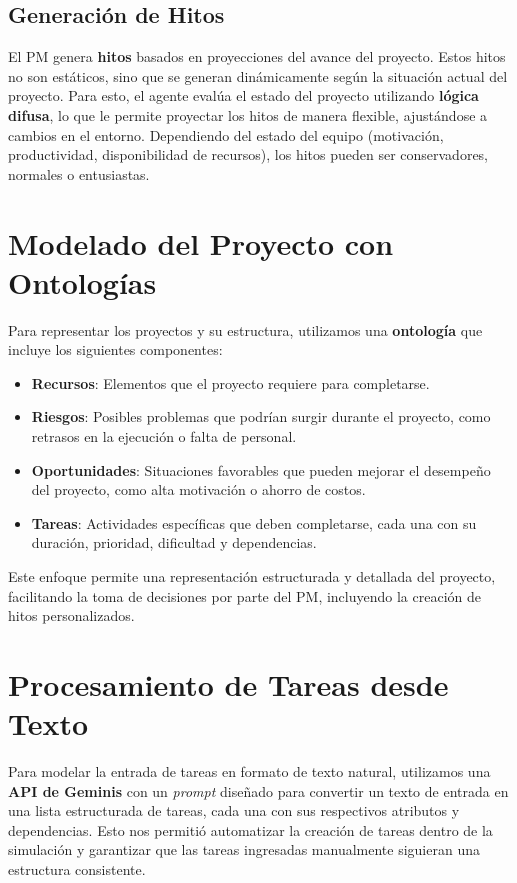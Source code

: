 \documentclass[a4paper, 12pt]{article}
\begin{document}
\subsection{Generación de Hitos}
El PM genera \textbf{hitos} basados en proyecciones del avance del proyecto. Estos hitos no son estáticos, sino que se generan dinámicamente según la situación actual del proyecto. Para esto, el agente evalúa el estado del proyecto utilizando \textbf{lógica difusa}, lo que le permite proyectar los hitos de manera flexible, ajustándose a cambios en el entorno. Dependiendo del estado del equipo (motivación, productividad, disponibilidad de recursos), los hitos pueden ser conservadores, normales o entusiastas.

\section{Modelado del Proyecto con Ontologías}
Para representar los proyectos y su estructura, utilizamos una \textbf{ontología} que incluye los siguientes componentes:
\begin{itemize}
    \item \textbf{Recursos}: Elementos que el proyecto requiere para completarse.
    \item \textbf{Riesgos}: Posibles problemas que podrían surgir durante el proyecto, como retrasos en la ejecución o falta de personal.
    \item \textbf{Oportunidades}: Situaciones favorables que pueden mejorar el desempeño del proyecto, como alta motivación o ahorro de costos.
    \item \textbf{Tareas}: Actividades específicas que deben completarse, cada una con su duración, prioridad, dificultad y dependencias.
\end{itemize}
Este enfoque permite una representación estructurada y detallada del proyecto, facilitando la toma de decisiones por parte del PM, incluyendo la creación de hitos personalizados.

\section{Procesamiento de Tareas desde Texto}
Para modelar la entrada de tareas en formato de texto natural, utilizamos una \textbf{API de Geminis} con un \textit{prompt} diseñado para convertir un texto de entrada en una lista estructurada de tareas, cada una con sus respectivos atributos y dependencias. Esto nos permitió automatizar la creación de tareas dentro de la simulación y garantizar que las tareas ingresadas manualmente siguieran una estructura consistente.
\end{document}

